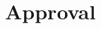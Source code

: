 \section*{Approval}

\vfill

\begin{center}
\namesigdate{\thesisauthor~-~\studentnumber}
\end{center}

\vfill

